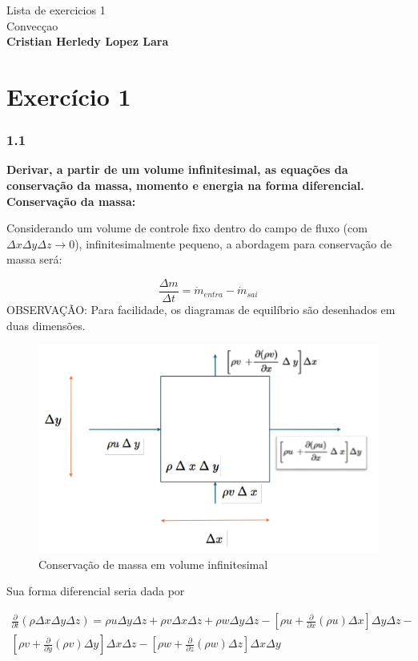 \documentclass[]{article}
\title{}
\author{}
\begin{document}
\begin{center}
	{\tiny {\normalsize {\large Lista de exercicios 1\\
Convecçao\\
\textbf{Cristian Herledy Lopez Lara}}}}
\end{center}

\section*{Exercício 1}
\subsubsection*{1.1}

\textbf{Derivar, a partir de um volume infinitesimal, as equações da conservação da massa, momento e energia na forma diferencial.} \\


\textbf{Conservação da massa:} 

Considerando um volume de controle fixo dentro do campo de fluxo (com $\Delta x \Delta y  \Delta z \rightarrow 0 $), infinitesimalmente pequeno, a abordagem para conservação de massa será:

\begin{equation}
	\frac{\Delta m}{\Delta t} = \dot{m}_{entra} - \dot{m}_{sai}
\end{equation}
OBSERVAÇÃO: Para facilidade, os diagramas de equilíbrio são desenhados em duas dimensões.

\begin{figure}[H]
	\centering
	\includegraphics[width=.65\textwidth]{figures/1_1}
	\caption{Conservação de massa em volume infinitesimal}
\end{figure}


Sua forma diferencial seria dada por

\begin{equation}
	\begin{aligned}
		\frac{\partial}{\partial t} (\rho \Delta x \Delta y \Delta z) = \rho u\Delta y\Delta z + \rho v\Delta x\Delta z + \rho w\Delta y\Delta z - [\rho u +	\frac{\partial}{\partial x}(\rho u)\Delta x]\Delta y\Delta z - \\ [\rho v +	\frac{\partial}{\partial y}(\rho v)\Delta y]\Delta x\Delta z - [\rho w +	\frac{\partial}{\partial z}(\rho w)\Delta z]\Delta x\Delta y
	\end{aligned}
\end{equation}
\end{document}
